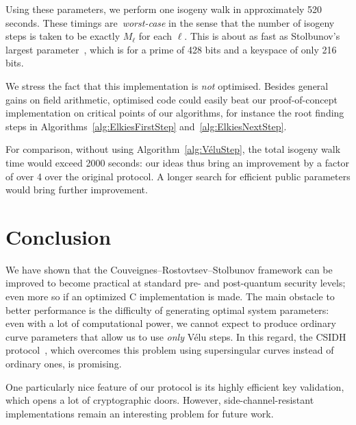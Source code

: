 \documentclass{llncs}
\begin{document}
Using these parameters, we perform one isogeny walk in
approximately 520 seconds.
These timings are~\emph{worst-case}
in the sense that the number of isogeny steps is taken
to be exactly $M_\ell$ for each $\ell$.
This is about as fast as Stolbunov's largest parameter~\cite{Stol},
which is for a prime of 428 bits and a keyspace of only 216 bits.

We stress the fact that this implementation
is \emph{not} optimised. Besides general gains on field arithmetic,
optimised code could easily beat our proof-of-concept implementation
on critical points of our algorithms, for instance the root finding steps 
in Algorithms~\ref{alg:ElkiesFirstStep}
and~\ref{alg:ElkiesNextStep}.

For comparison, without using Algorithm~\ref{alg:VéluStep}, the
total isogeny walk time would exceed 2000 seconds:
our ideas thus bring an improvement by a factor of over 4 over the
original protocol. A longer search for efficient public
parameters would bring further improvement.

\section{Conclusion}

We have shown that the Couveignes--Rostovtsev--Stolbunov
framework can be improved to become practical at standard pre- and
post-quantum security levels; 
even more so if an optimized C implementation is made. 
The main obstacle to better performance 
is the difficulty of generating optimal system parameters:
even with a lot of computational power,
we cannot expect to produce ordinary curve parameters
that allow us to use \emph{only} Vélu steps. 
In this regard, the CSIDH protocol~\cite{csidh}, 
which overcomes this problem using
supersingular curves instead of ordinary ones, is promising.

One particularly nice feature of our protocol is its highly efficient key validation,
which opens a lot of cryptographic doors. However, side-channel-resistant
implementations remain an interesting problem for future work.




\end{document}
